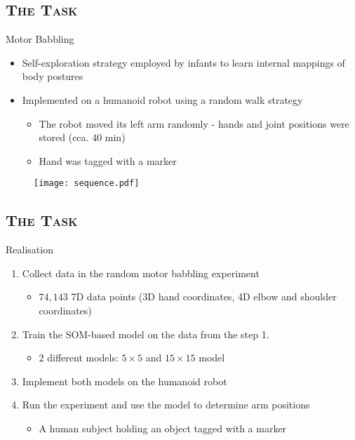 \documentclass[xcolor=x11names,dvipsnames,compress]{beamer}
\renewcommand{\(}{\begin{columns}}
\renewcommand{\)}{\end{columns}}
\newcommand{\<}[1]{\begin{column}{#1}}
\renewcommand{\>}{\end{column}}
\begin{document}
\subsection{\scshape The Task}
\begin{frame}{Motor Babbling}
  \begin{itemize}
  \item Self-exploration strategy employed by infants to learn internal mappings of body postures
  \item Implemented on a humanoid robot using a random walk strategy
    \begin{itemize}
    \item The robot moved its left arm randomly - hands and joint positions were stored (cca. 40 min)
    \item Hand was tagged with a marker    
    \end{itemize}    
  \end{itemize}
 

    \begin{figure}   
  \texttt{[image: sequence.pdf]}
  \end{figure}

\end{frame}



\subsection{\scshape The Task}
\begin{frame}{Realisation}
  \begin{enumerate}
   \item Collect data in the random motor babbling experiment
   \begin{itemize}
    \item $74,143$ 7D data points (3D hand coordinates, 4D elbow and shoulder coordinates)
   \end{itemize}
   \item Train the SOM-based model on the data from the step 1.
    \begin{itemize}
     \item 2 different models: $5\times5$ and $15\times15$ model
    \end{itemize}
   \item Implement both models on the humanoid robot
   \item Run the experiment and use the model to determine arm positions
    \begin{itemize}
    \item A human subject holding an object tagged with a marker
    \end{itemize}    
  \end{enumerate}
\end{frame}
\end{document}
